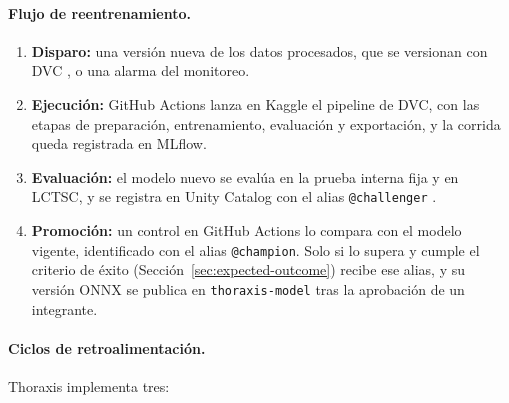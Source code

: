 \paragraph{Flujo de reentrenamiento.}
\begin{enumerate}
    \item \textbf{Disparo:} una versión nueva de los datos procesados, que se
          versionan con DVC \parencite{dvc}, o una alarma del monitoreo.
    \item \textbf{Ejecución:} GitHub Actions lanza en Kaggle el pipeline de
          DVC, con las etapas de preparación, entrenamiento, evaluación y
          exportación, y la corrida queda registrada en MLflow.
    \item \textbf{Evaluación:} el modelo nuevo se evalúa en la prueba interna
          fija y en LCTSC, y se registra en Unity Catalog con el alias
          \texttt{@challenger} \parencite{databricksaliases}.
    \item \textbf{Promoción:} un control en GitHub Actions lo compara con el
          modelo vigente, identificado con el alias \texttt{@champion}. Solo
          si lo supera y cumple el criterio de éxito
          (Sección~\ref{sec:expected-outcome}) recibe ese alias, y su versión
          ONNX se publica en \texttt{thoraxis-model} tras la aprobación de un
          integrante.
\end{enumerate}

\paragraph{Ciclos de retroalimentación.}
Thoraxis implementa tres:

